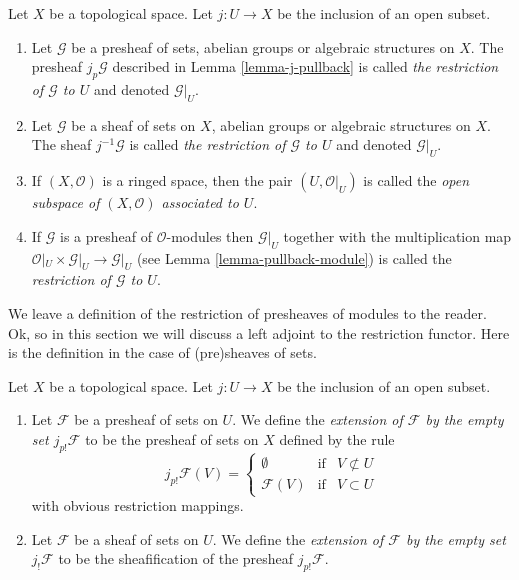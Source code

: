 \begin{definition}
\label{definition-restriction}
Let $X$ be a topological space.
Let $j : U \to X$ be the inclusion of an open subset.
\begin{enumerate}
\item Let $\mathcal{G}$ be a presheaf of sets, abelian groups or
algebraic structures on $X$. The presheaf $j_p\mathcal{G}$ described
in Lemma \ref{lemma-j-pullback} is called
{\it the restriction of $\mathcal{G}$ to $U$} and denoted $\mathcal{G}|_U$.
\item Let $\mathcal{G}$ be a sheaf of sets on $X$, abelian groups or
algebraic structures on $X$. The sheaf $j^{-1}\mathcal{G}$ is called
{\it the restriction of $\mathcal{G}$ to $U$} and denoted $\mathcal{G}|_U$.
\item If $(X, \mathcal{O})$ is a ringed space, then the pair
$(U, \mathcal{O}|_U)$ is called the
{\it open subspace of $(X, \mathcal{O})$ associated to $U$}.
\item If $\mathcal{G}$ is a presheaf of $\mathcal{O}$-modules
then $\mathcal{G}|_U$ together with the multiplication map
$\mathcal{O}|_U \times \mathcal{G}|_U \to \mathcal{G}|_U$
(see Lemma \ref{lemma-pullback-module})
is called the {\it restriction of $\mathcal{G}$ to $U$}.
\end{enumerate}
\end{definition}

\noindent
We leave a definition of the restriction of presheaves
of modules to the reader. Ok, so in this section we will
discuss a left adjoint to the restriction functor.
Here is the definition in the case of (pre)sheaves
of sets.

\begin{definition}
\label{definition-j-shriek}
Let $X$ be a topological space.
Let $j : U \to X$ be the inclusion of an open subset.
\begin{enumerate}
\item Let $\mathcal{F}$ be a presheaf of sets on $U$. We define
the {\it extension of $\mathcal{F}$ by the empty set $j_{p!}\mathcal{F}$}
to be the presheaf of sets on $X$ defined by the rule
$$
j_{p!}\mathcal{F}(V) =
\left\{
\begin{matrix}
\emptyset & \text{if} & V \not \subset U \\
\mathcal{F}(V) & \text{if} & V \subset U 
\end{matrix}
\right.
$$
with obvious restriction mappings.
\item Let $\mathcal{F}$ be a sheaf of sets on $U$. We define
the {\it extension of $\mathcal{F}$ by the empty set $j_!\mathcal{F}$}
to be the sheafification of the presheaf $j_{p!}\mathcal{F}$.
\end{enumerate}
\end{definition}

